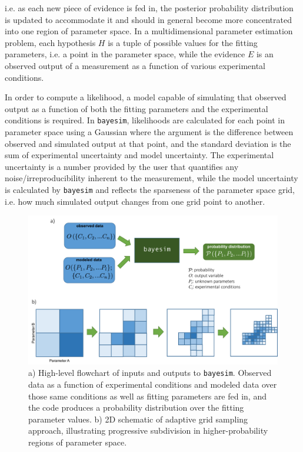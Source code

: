 \documentclass[aps,prl,amsmath,amssymb,superscriptaddress,notitlepage,groupedaddress]{revtex4-1}
\begin{document}
 i.e. as each new piece of evidence is fed in, the posterior probability distribution is updated to accommodate it and should in general become more concentrated into one region of parameter space. In a multidimensional parameter estimation problem, each hypothesis $H$ is a tuple of possible values for the fitting parameters, i.e. a point in the parameter space, while the evidence $E$ is an observed output of a measurement as a function of various experimental conditions.

 In order to compute a likelihood, a model capable of simulating that observed output as a function of both the fitting parameters and the experimental conditions is required. In \texttt{bayesim}, likelihoods are calculated for each point in parameter space using a Gaussian where the argument is the difference between observed and simulated output at that point, and the standard deviation is the sum of experimental uncertainty and model uncertainty. The experimental uncertainty is a number provided by the user that quantifies any noise/irreproducibility inherent to the measurement, while the model uncertainty is calculated by \texttt{bayesim} and reflects the sparseness of the parameter space grid, i.e. how much simulated output changes from one grid point to another.

 \begin{figure}
   \includegraphics[width=0.9\columnwidth]{figure_1.png}
   \caption{a) High-level flowchart of inputs and outputs to \texttt{bayesim}. Observed data as a function of experimental conditions and modeled data over those same conditions as well as fitting parameters are fed in, and the code produces a probability distribution over the fitting parameter values. b) 2D schematic of adaptive grid sampling approach, illustrating progressive subdivision in higher-probability regions of parameter space.}
   \label{fig1}
 \end{figure}
\end{document}

